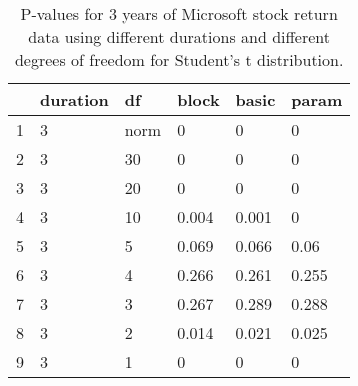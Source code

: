 \begin{table}[ht]
\centering
\caption{P-values for 3 years of Microsoft stock return 
                   data using different durations
  and different degrees of freedom for Student's t distribution.} 
\label{table:microsoft3}
\begin{tabular}{rlllll}
  \hline
 & duration & df & block & basic & param \\ 
  \hline
1 & 3 & norm & 0 & 0 & 0 \\ 
  2 & 3 & 30 & 0 & 0 & 0 \\ 
  3 & 3 & 20 & 0 & 0 & 0 \\ 
  4 & 3 & 10 & 0.004 & 0.001 & 0 \\ 
  5 & 3 & 5 & 0.069 & 0.066 & 0.06 \\ 
  6 & 3 & 4 & 0.266 & 0.261 & 0.255 \\ 
  7 & 3 & 3 & 0.267 & 0.289 & 0.288 \\ 
  8 & 3 & 2 & 0.014 & 0.021 & 0.025 \\ 
  9 & 3 & 1 & 0 & 0 & 0 \\ 
   \hline
\end{tabular}
\end{table}

